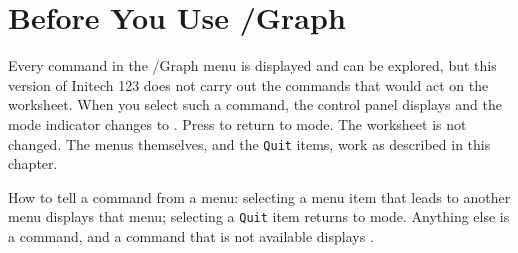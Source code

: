 \section{Before You Use /Graph}
\begin{Note}
Every command in the /Graph menu is displayed and can be explored, but this
version of Initech 123 does not carry out the commands that would act on the
worksheet.  When you select such a command, the control panel displays
 and the mode indicator changes to
.  Press  to return to  mode.  The worksheet
is not changed.  The menus themselves, and the \texttt{Quit} items, work as
described in this chapter.
\end{Note}
How to tell a command from a menu: selecting a menu item that leads to another
menu displays that menu; selecting a \texttt{Quit} item returns to
 mode.  Anything else is a command, and a command that is not
available displays .

